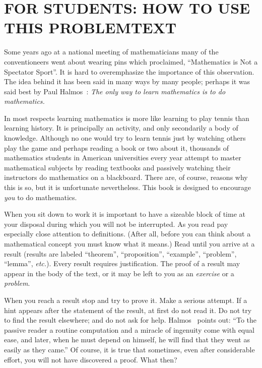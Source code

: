 \chapter*{FOR STUDENTS: HOW TO USE THIS PROBLEMTEXT}

Some years ago at a national meeting of mathematicians many of the conventioneers went about
wearing pins which proclaimed, ``Mathematics is Not a Spectator Sport''.  It is hard to
overemphasize the importance of this observation. The idea behind it has been said in many
ways by many people; perhaps it was said best by Paul Halmos~\cite{Halmos:1967}: \emph{The
only way to learn mathematics is to do mathematics.}

In most respects learning mathematics is more like learning to play tennis than learning
history.  It is principally an activity, and only secondarily a body of knowledge.  Although
no one would try to learn tennis just by watching others play the game and perhaps reading a
book or two about it, thousands of mathematics students in American universities every year
attempt to master mathematical subjects by reading textbooks and passively watching their
instructors do mathematics on a blackboard.  There are, of course, reasons why this is so, but
it is unfortunate nevertheless.  This book is designed to encourage \emph{you} to do
mathematics.

When you sit down to work it is important to have a sizeable block of time at your disposal
during which you will not be interrupted. As you read pay especially close attention to
definitions.  (After all, before you can think about a mathematical concept you must know what
it means.)  Read until you arrive at a result (results are labeled ``theorem'',
``proposition'', ``example'', ``problem'', ``lemma'', \emph{etc.}).  Every result requires
justification.  The proof of a result may appear in the body of the text, or it may be left to
you as an \emph{exercise} or a \emph{problem}.

When you reach a result stop and try to prove it.  Make a serious attempt.  If a hint appears
after the statement of the result, at first do not read it.  Do not try to find the result
elsewhere; and do not ask for help. Halmos~\cite{Halmos:1967} points out: ``To the passive
reader a routine computation and a miracle of ingenuity come with equal ease, and later, when
he must depend on himself, he will find that they went as easily as they came.''  Of course,
it is true that sometimes, even after considerable effort, you will not have discovered a
proof.  What then?

